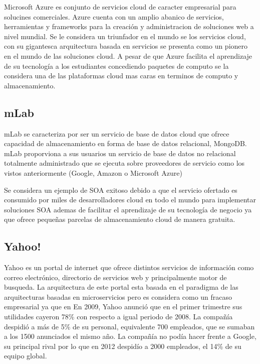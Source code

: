 \documentclass[a4paper,11pt]{book}
\begin{document}
Microsoft Azure es conjunto de servicios cloud de caracter empresarial para solucines comerciales. Azure cuenta con un amplio abanico de servicios, herramientas y frameworks para la creación y administracion de soluciones web a nivel mundial. Se le considera un triunfador en el mundo se los servicios cloud, con su gigantesca arquitectura basada en servicios se presenta como un pionero en el mundo de las soluciones cloud. A pesar de que Azure facilita el aprendizaje de su tecnología a los estudiantes concediendo paquetes de computo se la considera una de las plataformas cloud mas caras en terminos de computo y almacenamiento. 

\subsection{mLab}

mLab se caracteriza por ser un servicio de base de datos cloud que ofrece capacidad de almacenamiento en forma de base de datos relacional, MongoDB. mLab proporviona a sus usuarios un servicio de base de datos no relacional totalmente administrado que se ejecuta sobre proveedores de servicio como los vistos anteriormente (Google, Amazon o Microsoft Azure)

Se considera un ejemplo de SOA exitoso debido a que el servicio ofertado es consumido por miles de desarrolladores cloud en todo el mundo para implementar soluciones SOA ademas de facilitar el aprendizaje de su tecnología de negocio ya que ofrece pequeñas parcelas de almacenamiento cloud de manera gratuita. 

\subsection{Yahoo!}

Yahoo es un portal de internet que ofrece distintos servicios de información como correo electrónico, directorio de servicios web y principalmente motor de busqueda. La arquitectura de este portal esta basada en el paradigma de las arquitecturas basadas en microservicios pero es considera como un fracaso empresarial ya que en En 2009, Yahoo anunció que en el primer trimestre sus utilidades cayeron 78\% con respecto a igual periodo de 2008. La compañía despidió a más de 5\% de su personal, equivalente 700 empleados, que se sumaban a 
los 1500 anunciados el mismo año. La compañía no podía hacer frente a Google, su principal rival por lo que en 2012 despidío a 2000 empleados, el 14\% de su equipo global. 
\end{document}
